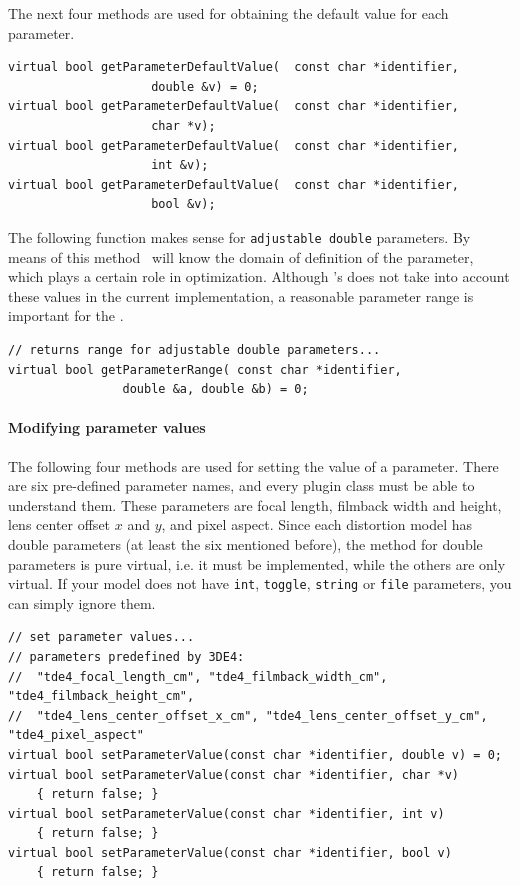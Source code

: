 \documentclass[10pt,a4paper]{article}
\begin{document}


The next four methods are used for obtaining the default value for each parameter.
\begin{lstlisting}[language=mycpp,tabsize=8]
virtual bool getParameterDefaultValue(	const char *identifier,
					double &v) = 0;
virtual bool getParameterDefaultValue(	const char *identifier,
					char *v);
virtual bool getParameterDefaultValue(	const char *identifier,
					int &v);
virtual bool getParameterDefaultValue(	const char *identifier,
					bool &v);
\end{lstlisting}
The following function makes sense for {\tt adjustable double} parameters. By means
of this method \tde\ will know the domain of definition of the parameter, which
plays a certain role in optimization. Although \tde's 
does not take into account these values in the current implementation,
a reasonable parameter range is important for the .

\begin{lstlisting}[language=mycpp,tabsize=8]
// returns range for adjustable double parameters...
virtual bool getParameterRange(	const char *identifier,
				double &a, double &b) = 0;
\end{lstlisting}
\paragraph{Modifying parameter values}
The following four methods are used for setting the value of a parameter.
There are six pre-defined parameter names, and every plugin class must be able to
understand them. These parameters are focal length, filmback width and height,
lens center offset $x$ and $y$, and pixel aspect. Since each distortion model
has double parameters (at least the six mentioned before), the method for
double parameters is pure virtual, i.e. it must be implemented, while the others
are only virtual. If your model does not have {\tt int}, {\tt toggle}, {\tt string} or {\tt file}
parameters, you can simply ignore them.
\begin{lstlisting}[language=mycpp,tabsize=8]
// set parameter values...
// parameters predefined by 3DE4:
// 	"tde4_focal_length_cm", "tde4_filmback_width_cm", "tde4_filmback_height_cm",
//	"tde4_lens_center_offset_x_cm", "tde4_lens_center_offset_y_cm", "tde4_pixel_aspect"
virtual bool setParameterValue(const char *identifier, double v) = 0;
virtual bool setParameterValue(const char *identifier, char *v)
	{ return false; }
virtual bool setParameterValue(const char *identifier, int v)
	{ return false; }
virtual bool setParameterValue(const char *identifier, bool v)
	{ return false; }
\end{lstlisting}
\end{document}
